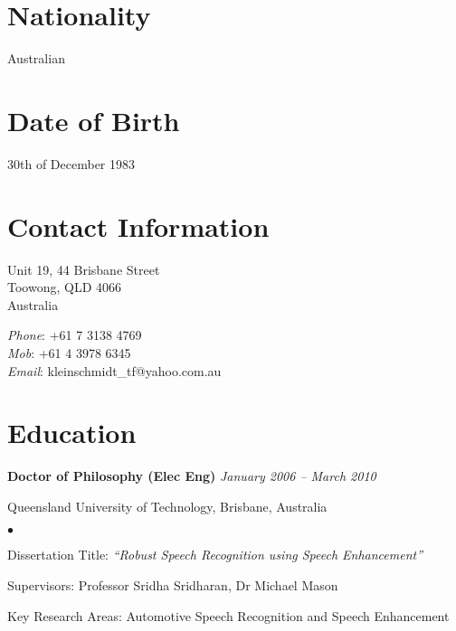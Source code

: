 \documentclass[margin,line]{resume}
\newenvironment{list1}{
  \begin{list}{}{%
      \setlength{\itemsep}{0in}
      \setlength{\parsep}{0in} \setlength{\parskip}{0in}
      \setlength{\topsep}{0in} \setlength{\partopsep}{0in}
      \setlength{\leftmargin}{0.17in}}}{\end{list}}
\newenvironment{list2}{
  \begin{list}{$\bullet$}{%
      \setlength{\itemsep}{0in}
      \setlength{\parsep}{0in} \setlength{\parskip}{0in}
      \setlength{\topsep}{0in} \setlength{\partopsep}{0in}
      \setlength{\leftmargin}{0.2in}}}{\end{list}}
\begin{document}
\begin{resume}

\section{\sc Nationality}
Australian

\section{\sc Date of Birth}
30th of December 1983

\section{\sc Contact Information}

\parbox[t]{3.3in}{%
Unit 19, 44 Brisbane Street\\
Toowong, QLD 4066\\
Australia
}
\parbox[t]{2.3in}{%
{\it Phone}: +61 7 3138 4769  \\
{\it Mob}: +61 4 3978 6345  \\
{\it Email}: kleinschmidt\_tf@yahoo.com.au}



\section{\sc Education}
{\bf Doctor of Philosophy (Elec Eng)} \hfill {\it January 2006 -- March 2010}\\\vspace{-0.85\baselineskip}
\begin{list1}
\item[] Queensland University of Technology, Brisbane, Australia
\begin{list2}
\item Dissertation Title: {\it ``Robust Speech Recognition using Speech Enhancement''}
\item Supervisors: Professor Sridha Sridharan, Dr Michael Mason
\item Key Research Areas: Automotive Speech Recognition and Speech Enhancement
\end{list2}
\end{list1}


\end{resume}
\end{document}

